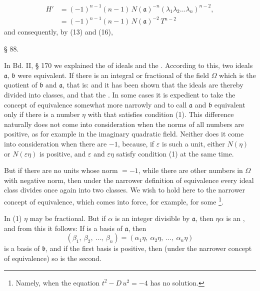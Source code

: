 \[
\begin{aligned}
H' &= (-1)^{n-1}(n-1)\,N(\mathfrak{a})^{-n}(\lambda_1\lambda_2\ldots\lambda_n)^{n-2}, \\
&= (-1)^{n-1}(n-1)\,N(\mathfrak{a})^{-2}\,T^{n-2}
\end{aligned}
\]
and consequently, by (13) and (16),

\begin{center}
§ 88. 
\end{center}

In Bd. II, § 170 we explained the  of ideals and the . According to this, two ideals $\mathfrak{a}$, $\mathfrak{b}$ were equivalent. If there is an integral or fractional  of the field $\Omega$ which is the quotient of $\mathfrak{b}$ and $\mathfrak{a}$, that is:
and it has been shown that the ideals are thereby divided into classes, and that the . In some cases it is expedient to take the concept of equivalence somewhat more narrowly and to call $\mathfrak{a}$ and $\mathfrak{b}$ equivalent only if there is a number $\eta$ with  that satisfies condition (1). This difference naturally does not come into consideration when the norms of all numbers are positive, as for example in the imaginary quadratic field. Neither does it come into consideration when there are  $-1$, because, if $\varepsilon$ is such a unit, either $N(\eta)$ or $N(\varepsilon\eta)$ is positive, and $\varepsilon$ and $\varepsilon\eta$ satisfy condition (1) at the same time.

But if there are no units whose norm $=-1$, while there are other numbers in $\Omega$ with negative norm, then under the narrower definition of equivalence every ideal class divides once again into two classes. We wish to hold here to the narrower concept of equivalence, which comes into force, for example, for some \footnote{Namely, when the  equation $t^2 - D\,u^2 = -4$ has no solution.}.

In (1) $\eta$ may be fractional. But if $\alpha$ is an integer divisible by $\mathfrak{a}$, then $\eta\alpha$ is an , and from this it follows: If
is a basis of $\mathfrak{a}$, then
\[
(\beta_1,\ \beta_2,\ \ldots,\ \beta_n) = (\alpha_1\eta,\ \alpha_2\eta,\ \ldots,\ \alpha_n\eta)
\]
is a basis of $\mathfrak{b}$, and if the first basis is positive, then (under the narrower concept of equivalence) so is the second.
